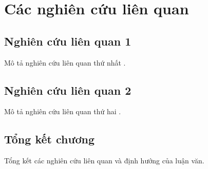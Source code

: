 \chapter{Các nghiên cứu liên quan}
\label{Chapter2}


\section{Nghiên cứu liên quan 1}

Mô tả nghiên cứu liên quan thứ nhất \cite{sample2024}.

\section{Nghiên cứu liên quan 2}

Mô tả nghiên cứu liên quan thứ hai \cite{english_sample2025}.

\section{Tổng kết chương}

Tổng kết các nghiên cứu liên quan và định hướng của luận văn.
